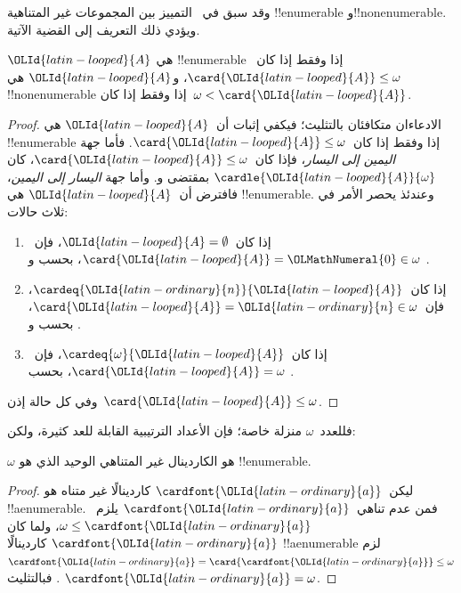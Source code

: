 \documentclass[../../../include/open-logic-section]{subfiles}
\begin{document}
وقد سبق في~ التمييز بين
المجموعات غير المتناهية !!{enumerable} و!!{nonenumerable}. ويؤدي ذلك
التعريف إلى القضية الآتية.

\begin{prop}
$\OLId{latin-looped}{A}$ هي !!{enumerable} إذا وفقط إذا كان~$\card{\OLId{latin-looped}{A}} \leq \omega$، و$\OLId{latin-looped}{A}$
هي !!{nonenumerable} إذا وفقط إذا كان~$\omega < \card{\OLId{latin-looped}{A}}$.
\end{prop}

\begin{proof}
الادعاءان متكافئان بالتثليث؛ فيكفي إثبات أن~$\OLId{latin-looped}{A}$ هي !!{enumerable}
إذا وفقط إذا كان~$\card{\OLId{latin-looped}{A}} \leq \omega$. فأما جهة
\emph{اليمين إلى اليسار}، فإذا كان~$\card{\OLId{latin-looped}{A}} \leq \omega$، كان
$\cardle{\OLId{latin-looped}{A}}{\omega}$ بمقتضى
و. وأما جهة \emph{اليسار إلى اليمين}،
فافترض أن~$\OLId{latin-looped}{A}$ هي !!{enumerable}. وعندئذ يحصر
 الأمر في ثلاث حالات:
\begin{enumerate}
	\item إذا كان~$\OLId{latin-looped}{A} = \emptyset$، فإن~$\card{\OLId{latin-looped}{A}} = \OLMathNumeral{0} \in \omega$، بحسب
	 و
	.
	\item إذا كان~$\cardeq{\OLId{latin-ordinary}{n}}{\OLId{latin-looped}{A}}$، فإن~$\card{\OLId{latin-looped}{A}} = \OLId{latin-ordinary}{n} \in \omega$، بحسب
	 و
	.
	\item إذا كان~$\cardeq{\omega}{\OLId{latin-looped}{A}}$، فإن~$\card{\OLId{latin-looped}{A}} = \omega$، بحسب
	.
\end{enumerate}
وفي كل حالة إذن~$\card{\OLId{latin-looped}{A}} \leq \omega$.
\end{proof}
\noindent
فللعدد~$\omega$ منزلة خاصة؛ فإن الأعداد الترتيبية القابلة للعد كثيرة،
ولكن:

\begin{cor}
$\omega$ هو الكاردينال غير المتناهي الوحيد الذي هو !!{enumerable}.
\end{cor}

\begin{proof}
ليكن~$\cardfont{\OLId{latin-ordinary}{a}}$ كاردينالًا غير متناه هو !!a{enumerable}. فمن عدم
تناهي~$\cardfont{\OLId{latin-ordinary}{a}}$ يلزم~$\omega \leq \cardfont{\OLId{latin-ordinary}{a}}$، ولما كان
$\cardfont{\OLId{latin-ordinary}{a}}$ كاردينالًا !!a{enumerable} لزم
$\cardfont{\OLId{latin-ordinary}{a}} = \card{\cardfont{\OLId{latin-ordinary}{a}}} \leq \omega$. فبالتثليث
$\cardfont{\OLId{latin-ordinary}{a}} = \omega$.
\end{proof}
\end{document}
